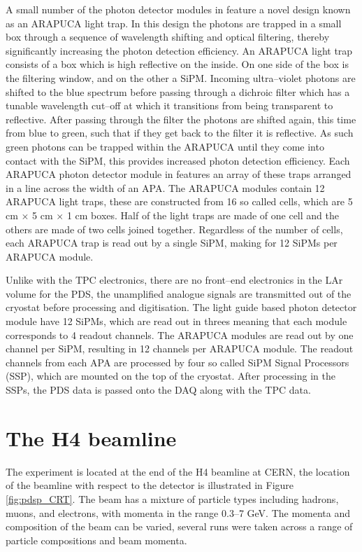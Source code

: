 A small number of the photon detector modules in \protodune{} feature a novel 
design known as an ARAPUCA light trap. In this design the photons are trapped 
in a small box through a sequence of wavelength shifting and optical 
filtering, thereby significantly increasing the photon detection 
efficiency\cite{Segreto:2018jdx}. An ARAPUCA light trap consists of a box 
which is high reflective on the inside. On one side of the box is 
the filtering window, and on the other a SiPM. Incoming ultra--violet photons 
are shifted to the blue spectrum before passing through a dichroic filter 
which has a tunable wavelength cut--off at which it transitions from being 
transparent to reflective. After passing through the filter the photons are 
shifted again, this time from blue to green, such that if they get back to the 
filter it is reflective. As such green photons can be trapped within the 
ARAPUCA until they come into contact with the SiPM, this provides increased 
photon detection efficiency. Each ARAPUCA photon detector module in 
\protodune{} features an array of these traps arranged in a line across the 
width of an APA. The ARAPUCA modules contain 12 ARAPUCA light traps, these are 
constructed from 16 so called cells, which are 5 cm $\times$ 5 cm $\times$ 1 
cm boxes.  Half of the light traps are made of one cell and the others are 
made of two cells joined together. Regardless of the number of cells, each 
ARAPUCA trap is read out by a single SiPM, making for 12 SiPMs per ARAPUCA 
module.

Unlike with the TPC electronics, there are no front--end electronics in the LAr
volume for the PDS, the unamplified analogue signals are transmitted out of the
cryostat before processing and digitisation. The light guide based photon 
detector module have 12 SiPMs, which are read out in threes meaning that each 
module corresponds to 4 readout channels. The ARAPUCA modules are read out by
one channel per SiPM, resulting in 12 channels per ARAPUCA module. The readout 
channels from each APA are processed by four so called SiPM Signal Processors 
(SSP), which are mounted on the top of the cryostat. After processing in the 
SSPs, the PDS data is passed onto the DAQ along with the TPC data.

\section{The H4 beamline} \label{sec:h4}

The \protodune{} experiment is located at the end of the H4 beamline at CERN,
the location of the beamline with respect to the detector is illustrated in
Figure \ref{fig:pdsp_CRT}. The beam has a mixture of particle types including
hadrons, muons, and electrons, with momenta in the range 0.3--7 GeV. The momenta
and composition of the beam can be varied, several runs were taken across a 
range of particle compositions and beam momenta.

